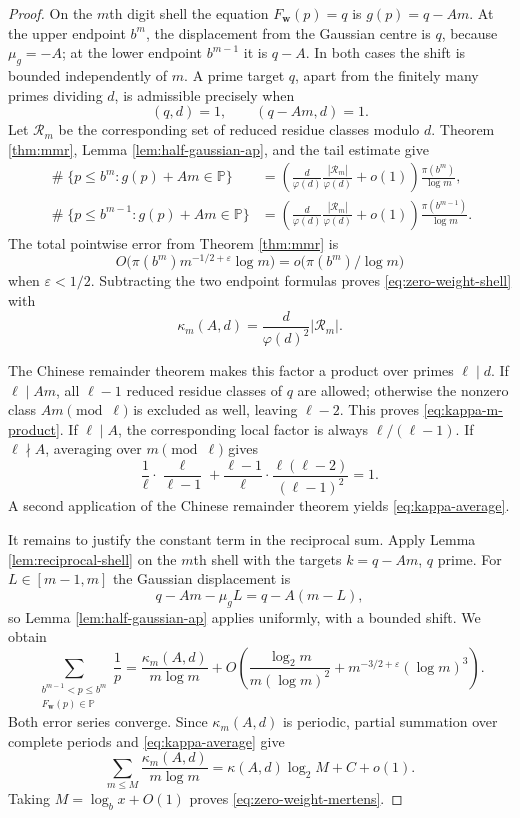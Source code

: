 \documentclass[11pt,reqno]{amsart}
\theoremstyle{plain}
\theoremstyle{definition}
\newcommand{\Pp}{\mathbb{P}}
\newcommand{\eps}{\varepsilon}
\newcommand{\1}{\mathbf 1}
\DeclareMathOperator{\Card}{\#}
\begin{document}
\begin{proof}
On the $m$th digit shell the equation $F_{\mathbf w}(p)=q$ is
$g(p)=q-Am$.
At the upper endpoint $b^m$, the displacement from the Gaussian centre is $q$, because $\mu_g=-A$; at the lower endpoint $b^{m-1}$ it is $q-A$.  In both cases the shift is bounded independently of $m$.  A prime target $q$, apart from the finitely many primes dividing $d$, is admissible precisely when
\[
 (q,d)=1,\qquad(q-Am,d)=1.
\]
Let $\mathcal R_m$ be the corresponding set of reduced residue classes modulo $d$.  Theorem \ref{thm:mmr}, Lemma \ref{lem:half-gaussian-ap}, and the tail estimate give
\begin{align*}
 \Card\{p\le b^m:g(p)+Am\in\Pp\}
 &=\left(\frac d{\varphi(d)}\frac{|\mathcal R_m|}{\varphi(d)}+o(1)\right)
 \frac{\pi(b^m)}{\log m},\\
 \Card\{p\le b^{m-1}:g(p)+Am\in\Pp\}
 &=\left(\frac d{\varphi(d)}\frac{|\mathcal R_m|}{\varphi(d)}+o(1)\right)
 \frac{\pi(b^{m-1})}{\log m}.
\end{align*}
The total pointwise error from Theorem \ref{thm:mmr} is
\[
 O\big(\pi(b^m)m^{-1/2+\eps}\log m\big)
 =o\big(\pi(b^m)/\log m\big)
\]
when $\eps<1/2$.  Subtracting the two endpoint formulas proves \eqref{eq:zero-weight-shell} with
\[
 \kappa_m(A,d)=\frac d{\varphi(d)^2}|\mathcal R_m|.
\]

The Chinese remainder theorem makes this factor a product over primes $\ell\mid d$.  If $\ell\mid Am$, all $\ell-1$ reduced residue classes of $q$ are allowed; otherwise the nonzero class $Am\pmod\ell$ is excluded as well, leaving $\ell-2$.  This proves \eqref{eq:kappa-m-product}.  If $\ell\mid A$, the corresponding local factor is always $\ell/(\ell-1)$.  If $\ell\nmid A$, averaging over $m\pmod\ell$ gives
\[
 \frac1\ell\cdot\frac\ell{\ell-1}
 +\frac{\ell-1}\ell\cdot\frac{\ell(\ell-2)}{(\ell-1)^2}=1.
\]
A second application of the Chinese remainder theorem yields \eqref{eq:kappa-average}.

It remains to justify the constant term in the reciprocal sum.  Apply Lemma \ref{lem:reciprocal-shell} on the $m$th shell with the targets $k=q-Am$, $q$ prime.  For $L\in[m-1,m]$ the Gaussian displacement is
\[
 q-Am-\mu_gL=q-A(m-L),
\]
so Lemma \ref{lem:half-gaussian-ap} applies uniformly, with a bounded shift.  We obtain
\begin{equation}\label{eq:zero-weight-shell-recip}
 \sum_{\substack{b^{m-1}<p\le b^m\\F_{\mathbf w}(p)\in\Pp}}\frac1p
 =\frac{\kappa_m(A,d)}{m\log m}
 +O\left(\frac{\log_2m}{m(\log m)^2}
 +m^{-3/2+\eps}(\log m)^3\right).
\end{equation}
Both error series converge.  Since $\kappa_m(A,d)$ is periodic, partial summation over complete periods and \eqref{eq:kappa-average} give
\[
 \sum_{m\le M}\frac{\kappa_m(A,d)}{m\log m}
 =\kappa(A,d)\log_2M+C+o(1).
\]
Taking $M=\log_bx+O(1)$ proves \eqref{eq:zero-weight-mertens}.
\end{proof}
\end{document}
